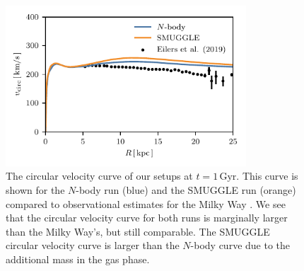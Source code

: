 \documentclass[twocolumn,linenumbers,trackchanges]{aastex631}
\newcommand{\Nbody}{$N$-body}
\newcommand{\SMUGGLE}{SMUGGLE}
\begin{document}
\begin{figure}
    \centering
    \includegraphics[width=9cm]{fig/vcirc.pdf}
    \caption{The circular velocity curve of our setups at $t=1\,\textrm{Gyr}$.
    This curve is shown for the \Nbody{} run (blue) and the \SMUGGLE{} run
    (orange) compared to observational estimates for the Milky Way
    \citep{2019ApJ...871..120E}. We see that the circular velocity curve for
    both runs is marginally larger than the Milky Way's, but still comparable.
    The \SMUGGLE{} circular velocity curve is larger than the \Nbody{} curve due
    to the additional mass in the gas phase.}
    \label{fig:vcirc}
\end{figure}



{}



\end{document}
